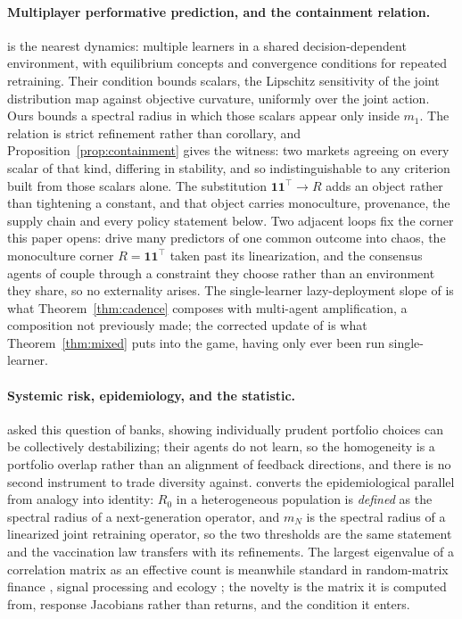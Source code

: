 \documentclass{article}
\theoremstyle{plain}
\theoremstyle{definition}
\newcommand{\mN}{m_N}
\begin{document}
\paragraph{Multiplayer performative prediction, and the containment relation.}
\citet{narang2023} is the nearest dynamics: multiple learners in a shared decision-dependent environment, with equilibrium concepts and convergence conditions for repeated retraining. Their condition bounds scalars, the Lipschitz sensitivity of the joint distribution map against objective curvature, uniformly over the joint action. Ours bounds a spectral radius in which those scalars appear only inside $m_1$. The relation is strict refinement rather than corollary, and Proposition~\ref{prop:containment} gives the witness: two markets agreeing on every scalar of that kind, differing in stability, and so indistinguishable to any criterion built from those scalars alone. The substitution $\mathbf{1}\mathbf{1}^{\top}\!\to R$ adds an object rather than tightening a constant, and that object carries monoculture, provenance, the supply chain and every policy statement below. Two adjacent loops fix the corner this paper opens: \citet{piliouras2023} drive many predictors of one common outcome into chaos, the monoculture corner $R=\mathbf{1}\mathbf{1}^{\top}$ taken past its linearization, and the consensus agents of \citet{li2022} couple through a constraint they choose rather than an environment they share, so no externality arises. The single-learner lazy-deployment slope of \citet{mendlerdunner2020} is what Theorem~\ref{thm:cadence} composes with multi-agent amplification, a composition not previously made; the corrected update of \citet{izzo2021} is what Theorem~\ref{thm:mixed} puts into the game, having only ever been run single-learner.

\paragraph{Systemic risk, epidemiology, and the statistic.}
\citet{beale2011} asked this question of banks, showing individually prudent portfolio choices can be collectively destabilizing; their agents do not learn, so the homogeneity is a portfolio overlap rather than an alignment of feedback directions, and there is no second instrument to trade diversity against. \citet{diekmann1990} converts the epidemiological parallel from analogy into identity: $R_0$ in a heterogeneous population is \emph{defined} as the spectral radius of a next-generation operator, and $\mN$ is the spectral radius of a linearized joint retraining operator, so the two thresholds are the same statement and the vaccination law transfers with its refinements. The largest eigenvalue of a correlation matrix as an effective count is meanwhile standard in random-matrix finance \citep{laloux1999,plerou2002}, signal processing \citep{roy2007} and ecology \citep{hill1973}; the novelty is the matrix it is computed from, response Jacobians rather than returns, and the condition it enters.
\end{document}
